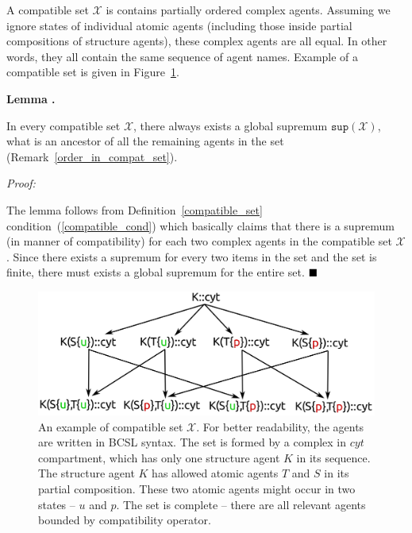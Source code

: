 \documentclass[12pt]{fithesis2}
\newcounter{counter}[section]
\renewcommand{\thecounter}{\thesection.\arabic{counter}}
\newenvironment{proof}{\noindent\emph{Proof:~ }\nopagebreak \begin{itshape}}{\end{itshape}\bigskip}
\newenvironment{lemma}{\bigskip\refstepcounter{counter}\noindent\textbf{Lemma \thecounter }\nopagebreak \begin{itshape}}{\end{itshape}\bigskip}
\newcommand*{\QEDA}{\hfill\ensuremath{\blacksquare}}%
\begin{document}
A compatible set $\mathscr{X}$ is contains partially ordered complex agents. Assuming we ignore states of individual atomic agents (including those inside partial compositions of structure agents), these complex agents are all equal. In other words, they all contain the same sequence of agent names. Example of a compatible set is given in Figure~\ref{compatible_set_example}.

\begin{lemma}
\label{global_supremum}
In every compatible set $\mathscr{X}$, there always exists a global supremum $\mathtt{sup}(\mathscr{X})$, what is an ancestor of all the remaining agents in the set (Remark~\ref{order_in_compat_set}).
\end{lemma}

\begin{proof}
The lemma follows from Definition~\ref{compatible_set} condition~(\ref{compatible_cond}) which basically claims that there is a supremum (in manner of compatibility) for each two complex agents in the compatible set $\mathscr{X}$. Since there exists a supremum for every two items in the set and the set is finite, there must exists a global supremum for the entire set. $\QEDA$
\end{proof}

\begin{figure}[!h]
\begin{center}
\includegraphics[scale=0.13]{pics/partial_order}
\end{center}
\caption{An example of compatible set $\mathscr{X}$. For better readability, the agents are written in BCSL syntax. The set is formed by a complex in $cyt$ compartment, which has only one structure agent $K$ in its sequence. The structure agent $K$ has allowed atomic agents $T$ and $S$ in its partial composition. These two atomic agents might occur in two states -- $u$ and $p$. The set is complete -- there are all relevant agents bounded by compatibility operator.}\label{compatible_set_example}
\end{figure}
\end{document}
